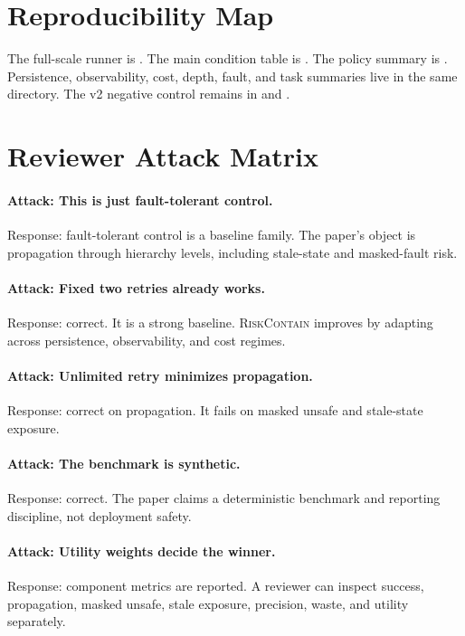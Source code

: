 \documentclass{article}
\newcommand{\method}{\textsc{RiskContain}\xspace}
\begin{document}
\section{Reproducibility Map}

The full-scale runner is . The main condition table is . The policy summary is . Persistence, observability, cost, depth, fault, and task summaries live in the same directory. The v2 negative control remains in  and .

\section{Reviewer Attack Matrix}

\paragraph{Attack: This is just fault-tolerant control.}
Response: fault-tolerant control is a baseline family. The paper's object is propagation through hierarchy levels, including stale-state and masked-fault risk.

\paragraph{Attack: Fixed two retries already works.}
Response: correct. It is a strong baseline. \method improves by adapting across persistence, observability, and cost regimes.

\paragraph{Attack: Unlimited retry minimizes propagation.}
Response: correct on propagation. It fails on masked unsafe and stale-state exposure.

\paragraph{Attack: The benchmark is synthetic.}
Response: correct. The paper claims a deterministic benchmark and reporting discipline, not deployment safety.

\paragraph{Attack: Utility weights decide the winner.}
Response: component metrics are reported. A reviewer can inspect success, propagation, masked unsafe, stale exposure, precision, waste, and utility separately.
\end{document}
